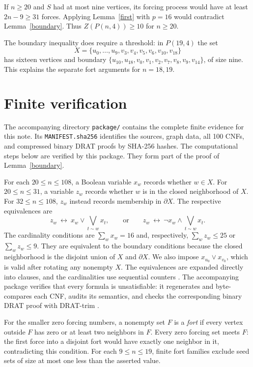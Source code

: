 \documentclass[10pt,a4paper]{article}
\newcommand{\bd}{\partial}
\newcommand{\ZF}{Z}
\begin{document}
If $n\ge20$ and $S$ had at most nine vertices, its forcing process would
have at least $2n-9\ge31$ forces. Applying Lemma~\ref{first} with $p=16$
would contradict Lemma~\ref{boundary}. Thus $\ZF(P(n,4))\ge10$ for $n\ge20$.

The boundary inequality does require a threshold: in $P(19,4)$ the set
\[
X=\{u_0,\ldots,u_9,v_3,v_4,v_5,v_6,v_{10},v_{18}\}
\]
has sixteen vertices and boundary
$\{u_{10},u_{18},v_0,v_1,v_2,v_7,v_8,v_9,v_{14}\}$, of size nine.
This explains the separate fort arguments for $n=18,19$.

\section{Finite verification}
The accompanying directory \texttt{package/} contains the complete
finite evidence for this note. Its \texttt{MANIFEST.sha256} identifies the
sources, graph data, all 100 CNFs, and compressed binary DRAT proofs by
SHA-256 hashes. The computational steps below are verified by this package.
They form part of the proof of Lemma~\ref{boundary}.

For each $20\le n\le108$, a Boolean variable $x_w$ records whether
$w\in X$. For $20\le n\le31$, a variable $z_w$ records whether $w$ is in
the closed neighborhood of $X$. For $32\le n\le108$, $z_w$ instead records
membership in $\bd X$. The respective equivalences are
\[
z_w\ \longleftrightarrow\ x_w\lor\bigvee_{t\sim w}x_t,
\qquad\text{or}\qquad
z_w\ \longleftrightarrow\ \neg x_w\land\bigvee_{t\sim w}x_t.
\]
The cardinality conditions are $\sum_w x_w=16$ and, respectively,
$\sum_w z_w\le25$ or $\sum_w z_w\le9$. They are equivalent to the
boundary conditions because the closed neighborhood is the disjoint
union of $X$ and $\bd X$. We also impose $x_{u_0}\lor x_{v_0}$, which is
valid after rotating any nonempty $X$. The equivalences are expanded
directly into clauses, and the cardinalities use sequential counters
\cite{Sinz}. The accompanying package verifies that every formula is unsatisfiable:
it regenerates and byte-compares each CNF, audits its semantics, and checks
the corresponding binary DRAT proof with DRAT-trim \cite{DRAT}.

For the smaller zero forcing numbers, a nonempty set $F$ is a \emph{fort}
if every vertex outside $F$ has zero or at least two neighbors in $F$.
Every zero forcing set meets $F$: the first force into a disjoint fort
would have exactly one neighbor in it, contradicting this condition.
For each $9\le n\le19$, finite fort families exclude seed sets of size
at most one less than the asserted value.
\end{document}
